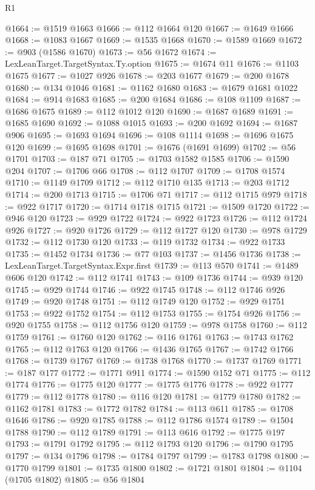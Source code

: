 \begin{lexlean}{R1}
\begin{coremodule}
@1664 := @1519 @1663
@1666 := @112 @1664 @120
@1667 := @1649 @1666
@1668 := @1083 @1667
@1669 := @1535 @1668
@1670 := @1589 @1669
@1672 := @903 (@1586 @1670)
@1673 := @56 @1672
@1674 := LexLeanTarget.TargetSyntax.Ty.option
@1675 := @1674 @11
@1676 := @1103 @1675
@1677 := @1027 @926
@1678 := @203 @1677
@1679 := @200 @1678
@1680 := @134 @1046
@1681 := @1162 @1680
@1683 := @1679 @1681 @1022
@1684 := @914 @1683
@1685 := @200 @1684
@1686 := @108 @1109
@1687 := @1686 @1675
@1689 := @112 @1012 @120
@1690 := @1687 @1689
@1691 := @1685 @1690
@1692 := @1088 @1015
@1693 := @200 @1692
@1694 := @1687 @906
@1695 := @1693 @1694
@1696 := @108 @1114
@1698 := @1696 @1675 @120
@1699 := @1695 @1698
@1701 := @1676 (@1691 @1699)
@1702 := @56 @1701
@1703 := @187 @71
@1705 := @1703 @1582 @1585
@1706 := @1590 @204
@1707 := @1706 @66
@1708 := @112 @1707
@1709 := @1708 @1574
@1710 := @1149 @1709
@1712 := @112 @1710 @135
@1713 := @203 @1712
@1714 := @200 @1713
@1715 := @1706 @71
@1717 := @112 @1715 @979
@1718 := @922 @1717
@1720 := @1714 @1718 @1715
@1721 := @1509 @1720
@1722 := @946 @120
@1723 := @929 @1722
@1724 := @922 @1723
@1726 := @112 @1724 @926
@1727 := @920 @1726
@1729 := @112 @1727 @120
@1730 := @978 @1729
@1732 := @112 @1730 @120
@1733 := @119 @1732
@1734 := @922 @1733
@1735 := @1452 @1734
@1736 := @77 @103
@1737 := @1456 @1736
@1738 := LexLeanTarget.TargetSyntax.Expr.first
@1739 := @113 @570
@1741 := @1489 @606 @120
@1742 := @112 @1741
@1743 := @109 @1736
@1744 := @939 @120
@1745 := @929 @1744
@1746 := @922 @1745
@1748 := @112 @1746 @926
@1749 := @920 @1748
@1751 := @112 @1749 @120
@1752 := @929 @1751
@1753 := @922 @1752
@1754 := @112 @1753
@1755 := @1754 @926
@1756 := @920 @1755
@1758 := @112 @1756 @120
@1759 := @978 @1758
@1760 := @112 @1759
@1761 := @1760 @120
@1762 := @116 @1761
@1763 := @1743 @1762
@1765 := @112 @1763 @120
@1766 := @1436 @1765
@1767 := @1742 @1766
@1768 := @1739 @1767
@1769 := @1738 @1768
@1770 := @1737 @1769
@1771 := @187 @177
@1772 := @1771 @911
@1774 := @1590 @152 @71
@1775 := @112 @1774
@1776 := @1775 @120
@1777 := @1775 @1776
@1778 := @922 @1777
@1779 := @112 @1778
@1780 := @116 @120
@1781 := @1779 @1780
@1782 := @1162 @1781
@1783 := @1772 @1782
@1784 := @113 @611
@1785 := @1708 @1646
@1786 := @920 @1785
@1788 := @112 @1786 @1574
@1789 := @1504 @1788
@1790 := @112 @1789
@1791 := @113 @616
@1792 := @1775 @197
@1793 := @1791 @1792
@1795 := @112 @1793 @120
@1796 := @1790 @1795
@1797 := @134 @1796
@1798 := @1784 @1797
@1799 := @1783 @1798
@1800 := @1770 @1799
@1801 := @1735 @1800
@1802 := @1721 @1801
@1804 := @1104 (@1705 @1802)
@1805 := @56 @1804

\end{coremodule}
\end{lexlean}
